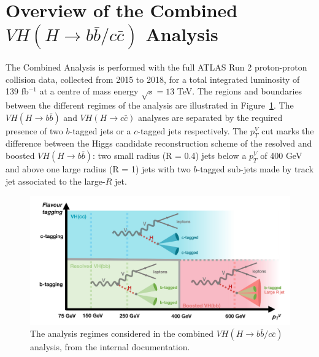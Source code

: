 \section{Overview of the Combined $VH (H\rightarrow b\bar{b}/c\bar{c})$ Analysis}
The Combined Analysis is performed with the full ATLAS Run 2 proton-proton collision data, collected from 2015 to 2018, for a total integrated luminosity of 139 fb$^{-1}$ at a centre of mass energy $\sqrt{s} = 13$ TeV. The regions and boundaries between the different regimes of the analysis are illustrated in Figure~\ref{fig:ana-strat}. The $VH (H\rightarrow b\bar{b})$ and $VH (H\rightarrow c\bar{c})$ analyses are separated by the required presence of two $b$-tagged jets or a $c$-tagged jets respectively. The $p_T^V$ cut marks the difference between the Higgs candidate reconstruction scheme of the resolved and boosted $VH (H\rightarrow b\bar{b})$: two small radius (R = 0.4) jets below a $p_T^V$ of 400 GeV and above one large radius (R = 1) jets with two $b$-tagged sub-jets made by  track jet associated to the large-$R$ jet.

\begin{figure}[h!]
\center
\includegraphics[width=\textwidth]{Images/VH/Cat/AnalysisRegime.png}
\caption{The analysis regimes considered in the combined $VH (H\rightarrow b\bar{b}/c\bar{c})$ analysis, from the internal documentation.} 
\label{fig:ana-strat}
\end{figure}

